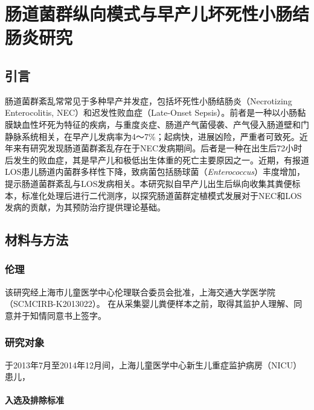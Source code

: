 
\chapter{肠道菌群纵向模式与早产儿坏死性小肠结肠炎研究}
\label{chap:nec}

\section{引言}
肠道菌群紊乱常常见于多种早产并发症，包括坏死性小肠结肠炎（Necrotizing Enterocolitis, NEC）和迟发性败血症（Late-Onset Sepsis）。前者是一种以小肠黏膜缺血性坏死为特征的疾病，与重度炎症、肠道产气菌侵袭、产气侵入肠道壁和门静脉系统相关\cite{neu2011necrotizing}，在早产儿发病率为4～7\%\cite{rees2010national}；起病快，进展凶险，严重者可致死。近年来有研究发现肠道菌群紊乱存在于NEC发病期间。后者是一种在出生后72小时后发生的败血症，其是早产儿和极低出生体重的死亡主要原因之一\cite{stoll2002late}。近期，有报道LOS患儿肠道内菌群多样性下降\cite{mai2013distortions}，致病菌包括肠球菌（\textit{Enterococcus}）丰度增加\cite{stewart2017longitudinal}，提示肠道菌群紊乱与LOS发病相关。本研究拟自早产儿出生后纵向收集其粪便标本，标准化处理后进行二代测序，以探究肠道菌群定植模式发展对于NEC和LOS发病的贡献，为其预防治疗提供理论基础。

\section{材料与方法}
  \subsection{伦理}
  该研究经上海市儿童医学中心伦理联合委员会批准，上海交通大学医学院（SCMCIRB-K2013022）。 在从采集婴儿粪便样本之前，取得其监护人理解、同意并于知情同意书上签字。
  \subsection{研究对象}
  于2013年7月至2014年12月间，上海儿童医学中心新生儿重症监护病房（NICU）患儿，
    \subsubsection{入选及排除标准}
